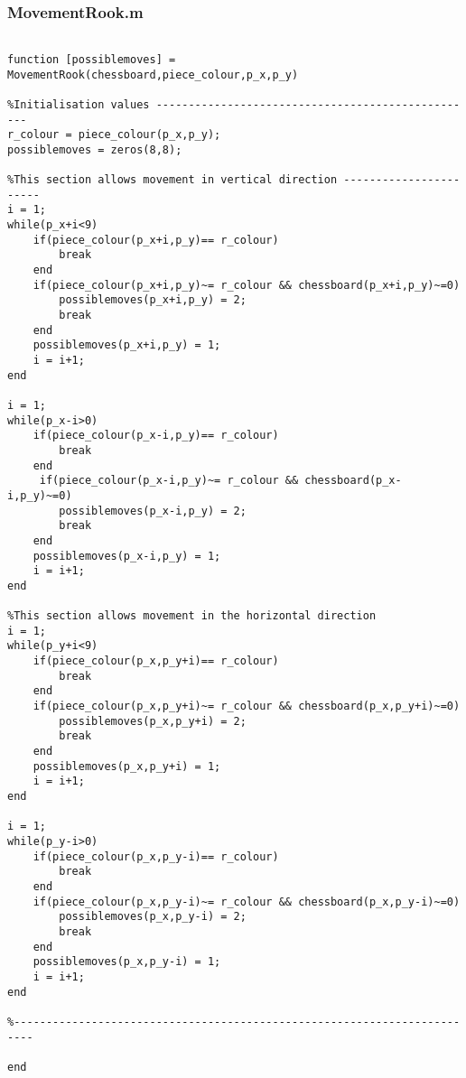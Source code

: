\documentclass{article}
\begin{document}
\subsubsection{MovementRook.m}
\begin{lstlisting}

function [possiblemoves] = MovementRook(chessboard,piece_colour,p_x,p_y)

%Initialisation values --------------------------------------------------
r_colour = piece_colour(p_x,p_y);
possiblemoves = zeros(8,8);

%This section allows movement in vertical direction -----------------------
i = 1;
while(p_x+i<9)
    if(piece_colour(p_x+i,p_y)== r_colour)
        break
    end
    if(piece_colour(p_x+i,p_y)~= r_colour && chessboard(p_x+i,p_y)~=0)
        possiblemoves(p_x+i,p_y) = 2;
        break
    end
    possiblemoves(p_x+i,p_y) = 1;
    i = i+1;
end
            
i = 1;
while(p_x-i>0)
    if(piece_colour(p_x-i,p_y)== r_colour)
        break
    end
     if(piece_colour(p_x-i,p_y)~= r_colour && chessboard(p_x-i,p_y)~=0)
        possiblemoves(p_x-i,p_y) = 2;
        break
    end
    possiblemoves(p_x-i,p_y) = 1;
    i = i+1;
end

%This section allows movement in the horizontal direction
i = 1;
while(p_y+i<9)
    if(piece_colour(p_x,p_y+i)== r_colour)
        break
    end
    if(piece_colour(p_x,p_y+i)~= r_colour && chessboard(p_x,p_y+i)~=0)
        possiblemoves(p_x,p_y+i) = 2;
        break
    end
    possiblemoves(p_x,p_y+i) = 1;
    i = i+1;
end

i = 1;
while(p_y-i>0)
    if(piece_colour(p_x,p_y-i)== r_colour)
        break
    end
    if(piece_colour(p_x,p_y-i)~= r_colour && chessboard(p_x,p_y-i)~=0)
        possiblemoves(p_x,p_y-i) = 2;
        break
    end
    possiblemoves(p_x,p_y-i) = 1;
    i = i+1;
end

%-------------------------------------------------------------------------

end
\end{lstlisting}
\end{document}
